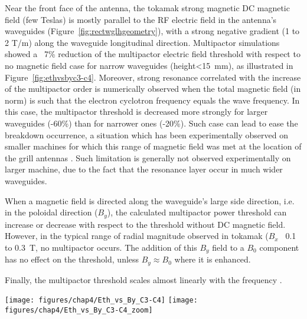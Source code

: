 Near the front face of the antenna, the tokamak strong magnetic DC magnetic field (few Teslas) is mostly parallel to the RF electric field in the antenna’s waveguides (Figure~\ref{fig:rectwglhgeometry}), with a strong negative gradient (1 to 2 T/m) along the waveguide longitudinal direction. Multipactor simulations showed a ~7\% reduction of the multipactor electric field threshold with respect to no magnetic field case for narrow waveguides (height<15~mm), as illustrated in Figure~\ref{fig:ethvsbyc3-c4}. Moreover, strong resonance correlated with the increase of the multipactor order is numerically observed when the total magnetic field (in norm) is such that the electron cyclotron frequency equals the wave frequency. In this case, the multipactor threshold is decreased more strongly for larger waveguides (-60\%) than for narrower ones (-20\%). Such case can lead to ease the breakdown occurrence, a situation which has been experimentally observed on smaller machines for which this range of magnetic field was met at the location of the grill antennas . Such limitation is generally not observed experimentally on larger machine, due to the fact that the resonance layer occur in much wider waveguides. 

When a magnetic field is directed along the waveguide’s large side direction, i.e. in the poloidal direction ($B_y$), the calculated multipactor power threshold can increase or decrease with respect to the threshold without DC magnetic field. However, in the typical range of radial magnitude observed in tokamak ($B_x$ ~0.1 to 0.3~T, no multipactor occurs. The addition of this $B_y$ field to a $B_0$ component has no effect on the threshold, unless $B_y \approx B_0$ where it is enhanced. 

Finally, the multipactor threshold scales almost linearly with the frequency .


\begin{figure*}[h]
	\centering
	\texttt{[image: figures/chap4/Eth\_vs\_By\_C3-C4]}
	\texttt{[image: figures/chap4/Eth\_vs\_By\_C3-C4\_zoom]}
	\caption{Left: Multipactor electric field threshold for the thin rectangular waveguides of the WEST LH1 and LH2 antennas (70x8mm for LH1 and 76x14.65mm for LH2) at 3.7~GHz versus magnitude of the DC magnetic field $B_0$ parallel to the electric field. Right: zoom for $B_0$ in [$0.12,0.14$T]. Dashed lines are the multipactor threshold without magnetic field. Green dot-dashed vertical line corresponds to cyclotron resonance magnetic field. SEY from Spark3D ECSS Copper (perfectly matched transmission line).}
	\label{fig:ethvsbyc3-c4}
\end{figure*}

